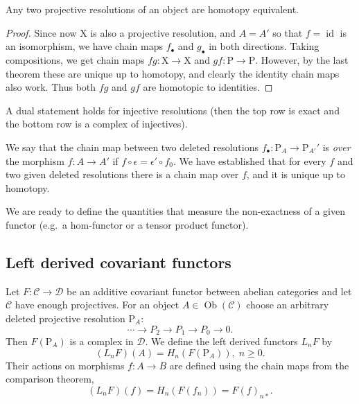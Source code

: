 \documentclass[english,letterpaper]{article}%
\numberwithin{equation}{section}
\numberwithin{figure}{section}
\numberwithin{table}{section}
\theoremstyle{definition}
\theoremstyle{definition}
\theoremstyle{definition}
\theoremstyle{plain}
\theoremstyle{plain}
\theoremstyle{plain}
\theoremstyle{plain}
\theoremstyle{remark}
\theoremstyle{remark}
\newcommand{\calC}{\mathcal{C}}
\newcommand{\calD}{\mathcal{D}}
\newcommand{\bm}[1]{\boldsymbol{\mathrm{#1}}}
\renewcommand{\geq}{\geqslant}
\DeclareMathOperator{\id}{id}
\DeclareMathOperator{\ob}{Ob}
\begin{document}
\begin{cor}
    Any two projective resolutions of an object are homotopy equivalent.
\end{cor}
\begin{proof}
     Since now $\bm X$ is also a projective resolution, and $A=A'$ so that $f=\id$ is an isomorphism, we have chain maps $f_\bullet$ and $g_\bullet$ in both directions. Taking compositions, we get chain maps $fg:\bm{X}\to \bm{X}$ and $gf:\bm{P}\to \bm{P}$. However, by the last theorem these are unique up to homotopy, and clearly the identity chain maps also work. Thus both $fg$ and $gf$ are homotopic to identities.
\end{proof}

\begin{cor}
    A dual statement holds for injective resolutions (then the top row is exact and the bottom row is a complex of injectives).
\end{cor}

\begin{defn}
    We say that the chain map between two deleted resolutions $f_\bullet:\bm{P}_A\to \bm{P}_{A'}'$ is \emph{over} the morphism $f:A\to A'$ if $f\circ \epsilon=\epsilon '\circ f_0$. We have established that for every $f$ and two given deleted resolutions there is a chain map over $f$, and it is unique up to homotopy.
\end{defn}

We are ready to define the quantities that measure the non-exactness of a given functor (e.g.\ a hom-functor or a tensor product functor).

\subsection{Left derived covariant functors}

\begin{defn}
    Let $F:\calC\to \calD$ be an additive covariant functor between abelian categories and let $\calC$ have enough projectives. For an object $A\in \ob(\calC)$ choose an arbitrary deleted projective resolution $\bm{P}_A$:
    \[\cdots \to P_2\to P_1\to P_0 \to 0.\]
    Then $F(\bm{P}_A)$ is a complex in $\calD$. We define the left derived functors $L_nF$ by 
    \[(L_n F) (A)=H_n(F(\bm{P}_A)), \; n\geq 0.\]
    Their actions on morphisms $f:A\to B$ are defined using the chain maps from the comparison theorem, \[(L_n F)(f)=H_n(F(f_n))=F(f)_{n\ast}.\]
\end{defn}
\end{document}

